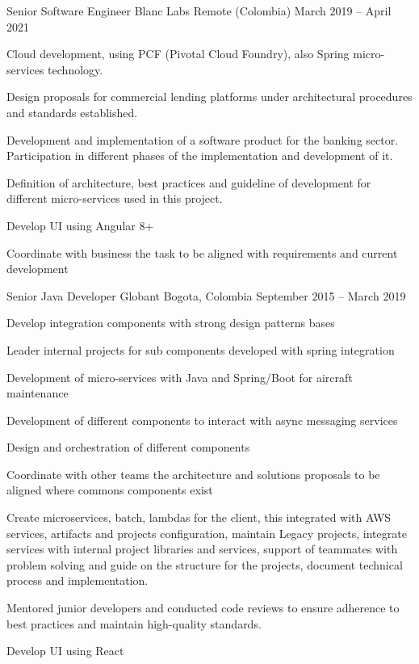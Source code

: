 \begin{cventries}
  \cventry
    {Senior Software Engineer} %
    {Blanc Labs} %
    {Remote (Colombia)} %
    {March 2019 – April 2021} %
    {
      \begin{cvitems} %
        \item {Cloud development, using PCF (Pivotal Cloud Foundry), also Spring micro-services technology.}
        \item {Design proposals for commercial lending platforms under architectural procedures and standards established.}
        \item {Development and implementation of a software product for the banking sector. Participation in different phases of the implementation and development of it.}
        \item {Definition of architecture, best practices and guideline of development for different micro-services used in this project.}
        \item {Develop UI using Angular 8+}
        \item {Coordinate with business the task to be aligned with requirements and current development}
      \end{cvitems}
    }

  \cventry
    {Senior Java Developer} %
    {Globant} %
    {Bogota, Colombia} %
    {September 2015 – March 2019} %
    {
      \begin{cvitems} %
        \item {Develop integration components with strong design patterns bases}
        \item {Leader internal projects for sub components developed with spring integration}
        \item {Development of micro-services with Java and Spring/Boot for aircraft maintenance}
        \item {Development of different components to interact with async messaging services}
        \item {Design and orchestration of different components}
        \item {Coordinate with other teams the architecture and solutions proposals to be aligned where commons components exist}
        \item {Create microservices, batch, lambdas for the client, this integrated with AWS services, artifacts and projects configuration, maintain Legacy projects, integrate services with internal project libraries and services, support of teammates with problem solving and guide on the structure for the projects, document technical process and implementation.}
        \item {Mentored junior developers and conducted code reviews to ensure adherence to best practices and maintain high-quality standards.}
        \item {Develop UI using React}
      \end{cvitems}
    }


\end{cventries}
